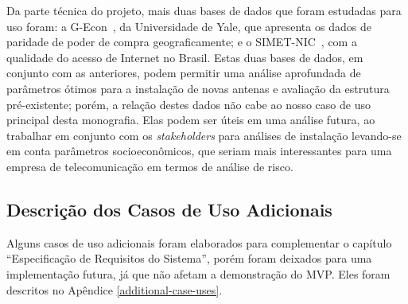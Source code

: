 \documentclass[]{politex}
\begin{document}
Da parte técnica do projeto, mais duas bases de dados que foram estudadas para
uso foram: a G-Econ~\cite{gecon}, da Universidade de Yale, que apresenta os
dados de paridade de poder de compra geograficamente; e o
SIMET-NIC~\cite{simet}, com a qualidade do acesso de Internet no Brasil. Estas
duas bases de dados, em conjunto com as anteriores, podem permitir uma análise
aprofundada de parâmetros ótimos para a instalação de novas antenas e avaliação
da estrutura pré-existente; porém, a relação destes dados não cabe ao nosso caso
de uso principal desta monografia. Elas podem ser úteis em uma análise futura,
ao trabalhar em conjunto com os \textit{stakeholders} para análises de
instalação levando-se em conta parâmetros socioeconômicos, que seriam mais
interessantes para uma empresa de telecomunicação em termos de análise de risco.

\subsection{Descrição dos Casos de Uso Adicionais}

Alguns casos de uso adicionais foram elaborados para complementar o capítulo
``Especificação de Requisitos do Sistema'', porém foram deixados para uma
implementação futura, já que não afetam a demonstração do MVP. Eles foram
descritos no Apêndice \ref{additional-case-uses}.

%

%
\end{document}
